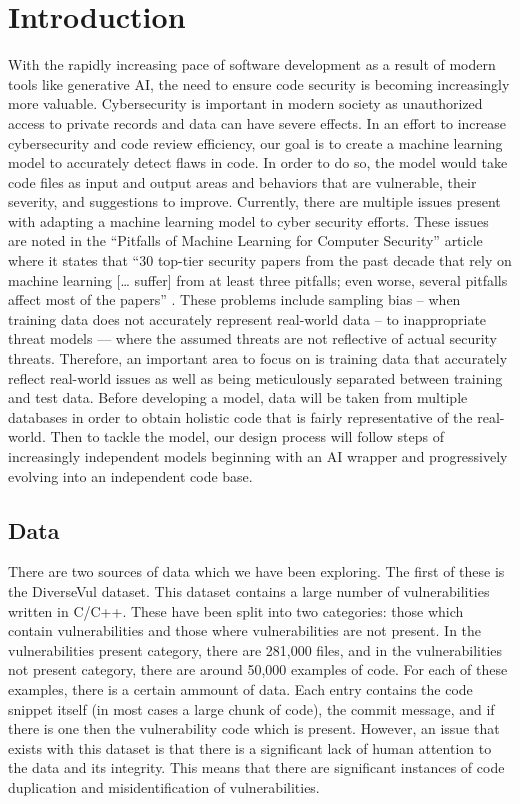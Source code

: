 \documentclass{article}
\begin{document}
\section{Introduction}
With the rapidly increasing pace of software development as a result of modern tools like generative AI, the need to ensure code security is becoming increasingly more valuable. Cybersecurity is important in modern society as unauthorized access to private records and data can have severe effects. In an effort to increase cybersecurity and code review efficiency, our goal is to create a machine learning model to accurately detect flaws in code. In order to do so, the model would take code files as input and output areas and behaviors that are vulnerable, their severity, and suggestions to improve. Currently, there are multiple issues present with adapting a machine learning model to cyber security efforts. These issues are noted in the “Pitfalls of Machine Learning for Computer Security” article where it states that “30 top-tier security papers from the past decade that rely on machine learning [… suffer] from at least three pitfalls; even worse, several pitfalls affect most of the papers” \cite{Arp2024}. These problems include sampling bias – when training data does not accurately represent real-world data – to inappropriate threat models — where the assumed threats are not reflective of actual security threats. Therefore, an important area to focus on is training data that accurately reflect real-world issues as well as being meticulously separated between training and test data. Before developing a model, data will be taken from multiple databases in order to obtain holistic code that is fairly representative of the real-world. Then to tackle the model, our design process will follow steps of increasingly independent models beginning with an AI wrapper and progressively evolving into an independent code base.


\subsection{Data}
There are two sources of data which we have been exploring. The first of these is the 
DiverseVul dataset. This dataset contains a large number of vulnerabilities written in C/C++.
These have been split into two categories: those which contain vulnerabilities and those
where vulnerabilities are not present. In the vulnerabilities present category, there are 
281,000 files, and in the vulnerabilities not present category, there are around 50,000
examples of code. For each of these examples, there is a certain ammount of data. Each entry
contains the code snippet itself (in most cases a large chunk of code), the commit message, and if there is one then the vulnerability code which is present. However, an issue that exists
with this dataset is that there is a significant lack of human attention to the data
and its integrity. This means that there are significant instances of code duplication and
misidentification of vulnerabilities.
\end{document}
